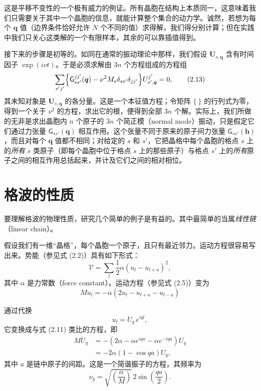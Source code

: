 这是平移不变性的一个极有威力的例证。所有晶胞在结构上本质同一，这意味着我们只需要关于其中一个晶胞的信息，就能计算整个集合的动力学。诚然，若想为每个 $\boldsymbol{q}$ 值（边界条件恰好允许 $N$ 个不同的值）求得解，我们得分别计算；但在实践中我们只关心这类解的一个有限样本，其余的可以靠插值得到。

接下来的步骤是初等的。如同在通常的振动理论中那样，我们假设 $\mathbf{U}_{s,\boldsymbol{q}}$ 含有时间因子 $\exp(i\nu t)$。于是必须求解由 $3n$ 个方程组成的方程组
\begin{equation*}
\sum_{s'j'} \Bigl\{ \mathsf{G}_{ss'}^{jj'}(\boldsymbol{q}) - \nu^2 M_s \delta_{ss'} \delta_{jj'} \Bigr\} U_{s',\boldsymbol{q}}^{j'} = 0,
\tag{2.13}
\end{equation*}
其未知对象是 $\mathbf{U}_{s,\boldsymbol{q}}$ 的各分量。这是一个本征值方程；令矩阵 $\{\ \}$ 的行列式为零，得到一个关于 $\nu^2$ 的方程，求出它的根，便得到全部 $3n$ 个解。实际上，我们所做的无非是求出晶胞内 $n$ 个原子的 $3n$ 个简正模（normal mode）振动，只是假定它们通过力张量 $\mathsf{G}_{ss'}(\boldsymbol{q})$ 相互作用。这个张量不同于原来的原子间力张量 $\mathsf{G}_{ss'}(\boldsymbol{h})$，而且对每个 $\boldsymbol{q}$ 值都不相同；对给定的 $s$ 和 $s'$，它把晶格中每个晶胞的格点 $s$ 上的\emph{所有} $s$ 类原子（即每个晶胞中位于格点 $s$ 上的那些原子）与格点 $s'$ 上的\emph{所有}原子之间的相互作用总括起来，并计及它们之间的相对相位。

\section{格波的性质}

要理解格波的物理性质，研究几个简单的例子是有益的。其中最简单的当属\emph{线性链}（linear chain）。

假设我们有一维“晶格”，每个晶胞一个原子，且只有最近邻力。运动方程很容易写出来。势能（参见式 (2.2)）具有如下形式：
\begin{equation*}
\mathcal{V} = \sum_{l} \frac{1}{2} \alpha \left( u_{l} - u_{l+a} \right)^2,
\tag{2.14}
\end{equation*}
其中 $\alpha$ 是力常数（force constant）。运动方程（参见式 (2.5)）变为
\begin{equation*}
M \ddot{u}_{l} = - \alpha \left( 2u_{l} - u_{l+a} - u_{l-a} \right)
\tag{2.15}
\end{equation*}


通过代换
\begin{equation*}
u_{l} = U_{q}\, e^{iql},
\tag{2.16}
\end{equation*}
它变换成与式 (2.11) 类比的方程，即
\begin{align*}
M \ddot{U}_{q} &= - \left( 2\alpha - \alpha e^{iqa} - \alpha e^{-iqa} \right) U_{q} \\
&= - 2\alpha \left( 1 - \cos qa \right) U_{q},
\tag{2.17}
\end{align*}
其中 $a$ 是链中原子的间距。这是一个简谐振子的方程，其频率为
\begin{equation*}
\nu_{q} = \sqrt{\left( \frac{\alpha}{M} \right)}\, 2 \sin \left( \frac{qa}{2} \right).
\tag{2.18}
\end{equation*}

